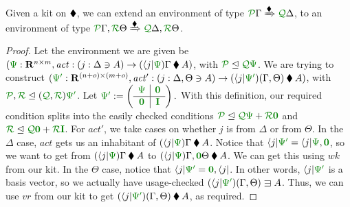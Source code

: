 \documentclass[submission,copyright,creativecommons]{eptcs}
\begin{document}
\begin{lemma}\label{lem:bind}
  Given a kit on $\mathbin{\blacklozenge}$, we can extend an environment of type
  $\ctx{\Gamma}{P} \subst{\kitrel} \ctx{\Delta}{Q}$, to an environment of type
  $\ctx{\Gamma}{P}, \ctx{\Theta}{R} \subst{\kitrel}
  \ctx{\Delta}{Q}, \ctx{\Theta}{R}$.
\end{lemma}
\begin{proof}
  Let the environment we are given be
  $(\rescomment\Psi : \mathbf R^{n \times m},
  \mathit{act} : (j : \Delta \ni A) \to (\langle j \rvert\rescomment\Psi)\Gamma \kitrel A)$,
  with $\resctx P \subres \resctx Q \rescomment\Psi$.
  We are trying to construct
  $(\rescomment{\Psi'} : \mathbf R^{(n + o) \times (m + o)},
  \mathit{act'} : (j : \Delta, \Theta \ni A) \to
  (\langle j \rvert\rescomment{\Psi'})(\Gamma, \Theta) \kitrel A)$,
  with $\resctx P, \resctx R \subres (\resctx Q, \resctx R) \rescomment{\Psi'}$.
%
  Let \(
    \rescomment{\Psi'} := \left(\begin{array}{c|c}
                                  \rescomment\Psi & \rescomment{\mat 0}
                                  \\ \hline
                                  \rescomment{\mat 0} & \rescomment{\mat I}
                                \end{array}\right).
  \)
  With this definition, our required condition splits into the easily checked
  conditions
  $\resctx P \subres \resctx Q\rescomment\Psi + \resctx R\rescomment{\mat 0}$
  and
  $\resctx R \subres
  \resctx Q\rescomment{\mat 0} + \resctx R\rescomment{\mat I}$.
%
  For $\mathit{act'}$, we take cases on whether $j$ is from $\Delta$ or from
  $\Theta$.
%
  In the $\Delta$ case, $\mathit{act}$ gets us an inhabitant of
  $(\langle j \rvert\rescomment\Psi)\Gamma \kitrel A$.
  Notice that
  $\langle j \rvert\rescomment{\Psi'} =
  \langle j \rvert\rescomment\Psi, \rescomment{\vct 0}$,
  so we want to get from $(\langle j \rvert\rescomment\Psi)\Gamma \kitrel A$ to
  $(\langle j \rvert\rescomment\Psi)\Gamma, \rescomment{\vct 0}\Theta
  \kitrel A$.
  We can get this using $\mathit{wk}$ from our kit.
%
  In the $\Theta$ case, notice that
  $\langle j \rvert\rescomment{\Psi'} = \rescomment{\vct 0}, \langle j \rvert$.
  In other words, $\langle j \rvert\rescomment{\Psi'}$ is a basis vector, so we
  actually have usage-checked
  $(\langle j \rvert\rescomment{\Psi'})(\Gamma, \Theta) \lvar A$.
  Thus, we can use $\mathit{vr}$ from our kit to get
  $(\langle j \rvert\rescomment{\Psi'})(\Gamma, \Theta) \kitrel A$, as required.
\end{proof}
\end{document}
